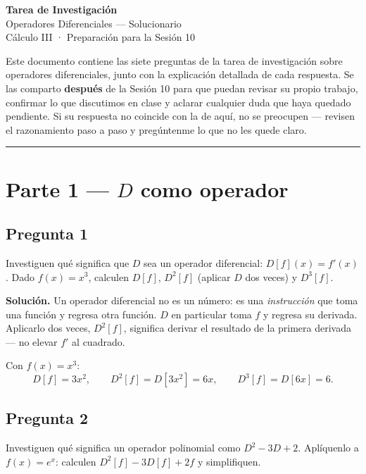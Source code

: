 \documentclass[11pt]{article}
\begin{document}
\begin{center}
  {\Huge\bfseries\color{navy} Tarea de Investigación}\\[4pt]
  {\LARGE\color{cyandeep} Operadores Diferenciales — Solucionario}\\[8pt]
  {\large\color{slate} Cálculo III · Preparación para la Sesión 10}
\end{center}

\vspace{0.6em}
\noindent
Este documento contiene las siete preguntas de la tarea de investigación sobre operadores diferenciales, junto con la explicación detallada de cada respuesta. Se las comparto \textbf{después} de la Sesión 10 para que puedan revisar su propio trabajo, confirmar lo que discutimos en clase y aclarar cualquier duda que haya quedado pendiente. Si su respuesta no coincide con la de aquí, no se preocupen — revisen el razonamiento paso a paso y pregúntenme lo que no les quede claro.

\vspace{0.6em}
\hrule
\vspace{0.8em}

\section*{Parte 1 — $D$ como operador}

\subsection*{Pregunta 1}
\begin{pregunta}
Investiguen qué significa que $D$ sea un operador diferencial: $D[f](x) = f'(x)$. Dado $f(x)=x^3$, calculen $D[f]$, $D^2[f]$ (aplicar $D$ dos veces) y $D^3[f]$.
\end{pregunta}

\noindent\textbf{Solución.} Un operador diferencial no es un número: es una \emph{instrucción} que toma una función y regresa otra función. $D$ en particular toma $f$ y regresa su derivada. Aplicarlo dos veces, $D^2[f]$, significa derivar el resultado de la primera derivada — no elevar $f'$ al cuadrado.

Con $f(x)=x^3$:
\[
D[f] = 3x^2, \qquad D^2[f] = D[3x^2] = 6x, \qquad D^3[f] = D[6x] = 6.
\]

\subsection*{Pregunta 2}
\begin{pregunta}
Investiguen qué significa un operador polinomial como $D^2-3D+2$. Aplíquenlo a $f(x)=e^{x}$: calculen $D^2[f]-3D[f]+2f$ y simplifiquen.
\end{pregunta}
\end{document}

